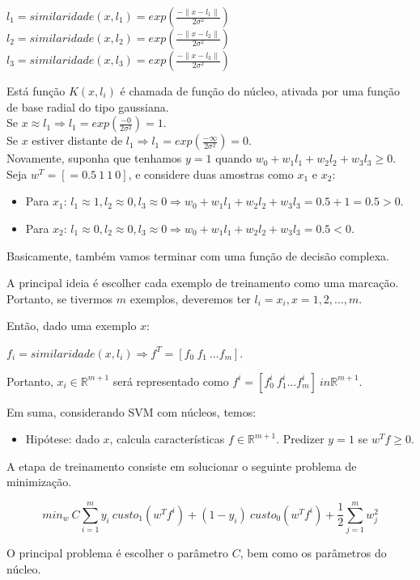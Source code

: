 \begin{center}
$l_1 = similaridade(x,l_1) = exp(\frac{-\parallel x - l_1 \parallel}{2\sigma^2})$ \\	
$l_2 = similaridade(x,l_2) = exp(\frac{-\parallel x - l_2 \parallel}{2\sigma^2})$ \\	
$l_3 = similaridade(x,l_3) = exp(\frac{-\parallel x - l_3 \parallel}{2\sigma^2})$ \\	
\end{center}

Está função $K(x, l_i)$ é chamada de função do núcleo, ativada por uma função de base radial do tipo gaussiana. \\

\noindent Se $x \approx l_1 \Rightarrow l_1 = exp(\frac{-0}{2\sigma^2}) = 1$.
\\
Se $x$ estiver distante de $l_1 \Rightarrow l_1 = exp(\frac{-\infty}{2\sigma^2}) = 0$. \\

Novamente, suponha que tenhamos $y = 1$ quando $w_0 + w_1l_1 + w_2l_2 + w_3l_3 \geq 0$. Seja $w^T = [=0.5 \ 1 \ 1 \ 0]$, e considere duas amostras como $x_1$ e $x_2$:

\begin{itemize}
\item Para $x_1$: $l_1 \approx 1, l_2 \approx 0, l_3 \approx 0 \Rightarrow w_0 + w_1l_1 + w_2l_2 + w_3l_3 = 0.5 + 1 = 0.5 > 0$.
\item Para $x_2$: $l_1 \approx 0, l_2 \approx 0, l_3 \approx 0 \Rightarrow w_0 + w_1l_1 + w_2l_2 + w_3l_3 = 0.5 < 0$.
\end{itemize}
  
Basicamente, também vamos terminar com uma função de decisão complexa.

A principal ideia é escolher cada exemplo de treinamento como uma marcação. Portanto, se tivermos $m$ exemplos, deveremos ter $l_i = x_i, x = 1, 2, \dots, m$.

Então, dado uma exemplo $x$:

\begin{center}
$f_i = similaridade(x, l_i) \Rightarrow f^T = [f_0 \ f_1 \ \dots f_m]$.	
\end{center}

Portanto, $x_i \in \mathbb{R}^{m+1}$ será representado como $f^i = [f_0^i \ f_1^i \dots f_m^i] \ in \mathbb{R}^{m+1}$.

Em suma, considerando SVM com núcleos, temos:

\begin{itemize}
\item Hipótese: dado $x$, calcula características $f \in \mathbb{R}^{m+1}$. Predizer $y = 1$ se $w^Tf \geq 0$.
\end{itemize}

A etapa de treinamento consiste em solucionar o seguinte problema de minimização.

\begin{equation}
min_w \ C \sum\limits_{i=1}^m y_i \ custo_1 (w^Tf^i) + (1 - y_i) \ custo_0 (w^Tf^i) + \frac{1}{2} \sum\limits_{j=1}^m w_j^2
\end{equation}

O principal problema é escolher o parâmetro $C$, bem como os parâmetros do núcleo.
